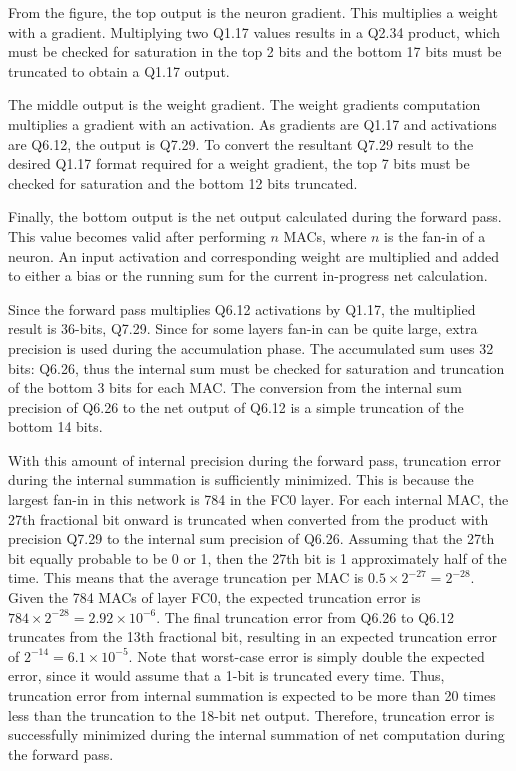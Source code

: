 From the figure, the top output is the neuron gradient. This multiplies a weight with a gradient. Multiplying two Q1.17 values results in a Q2.34 product, which must be checked for saturation in the top 2 bits and the bottom 17 bits must be truncated to obtain a Q1.17 output.

The middle output is the weight gradient. The weight gradients computation multiplies a gradient with an activation. As gradients are Q1.17 and activations are Q6.12, the output is Q7.29. To convert the resultant Q7.29 result to the desired Q1.17 format required for a weight gradient, the top 7 bits must be checked for saturation and the bottom 12 bits truncated. 

Finally, the bottom output is the net output calculated during the forward pass. This value becomes valid after performing $n$ MACs, where $n$ is the fan-in of a neuron. An input activation and corresponding weight are multiplied and added to either a bias or the running sum for the current in-progress net calculation. 

Since the forward pass multiplies Q6.12 activations by Q1.17, the multiplied result is 36-bits, Q7.29. Since for some layers fan-in can be quite large, extra precision is used during the accumulation phase. The accumulated sum uses 32 bits: Q6.26, thus the internal sum must be checked for saturation and truncation of the bottom 3 bits for each MAC. The conversion from the internal sum precision of Q6.26 to the net output of Q6.12 is a simple truncation of the bottom 14 bits.

With this amount of internal precision during the forward pass, truncation error during the internal summation is sufficiently minimized. This is because the largest fan-in in this network is 784 in the FC0 layer. For each internal MAC, the 27th fractional bit onward is truncated when converted from the product with precision Q7.29 to the internal sum precision of Q6.26. Assuming that the 27th bit equally probable to be 0 or 1, then the 27th bit is 1 approximately half of the time. This means that the average truncation per MAC is $0.5 \times 2^{-27} = 2^{-28}$. Given the 784 MACs of layer FC0, the expected truncation error is $784 \times 2^{-28} = 2.92\times{10^{-6}}$. The final truncation error from Q6.26 to Q6.12 truncates from the 13th fractional bit, resulting in an expected truncation error of $2^{-14} = 6.1\times10^{-5}$. Note that worst-case error is simply double the expected error, since it would assume that a 1-bit is truncated every time. Thus, truncation error from internal summation is expected to be more than 20 times less than the truncation to the 18-bit net output. Therefore, truncation error is successfully minimized during the internal summation of net computation during the forward pass.

